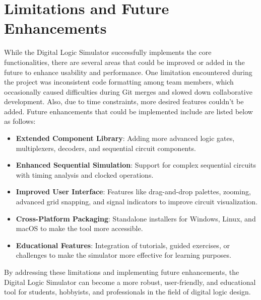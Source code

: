 \section{Limitations and Future Enhancements}
While the Digital Logic Simulator successfully implements the core functionalities, there are several areas that could be improved or added in the future to enhance usability and performance. One limitation encountered during the project was inconsistent code formatting among team members, which occasionally caused difficulties during Git merges and slowed down collaborative development. Also, due to time constraints, more desired features couldn't be added. Future enhancements that could be implemented include are listed below as follows:
\begin{itemize}
    \item \textbf{Extended Component Library}: Adding more advanced logic gates, multiplexers, decoders, and sequential circuit components.
    \item \textbf{Enhanced Sequential Simulation}: Support for complex sequential circuits with timing analysis and clocked operations.
    \item \textbf{Improved User Interface}: Features like drag-and-drop palettes, zooming, advanced grid snapping, and signal indicators to improve circuit visualization.
    \item \textbf{Cross-Platform Packaging}: Standalone installers for Windows, Linux, and macOS to make the tool more accessible.
    \item \textbf{Educational Features}: Integration of tutorials, guided exercises, or challenges to make the simulator more effective for learning purposes.
\end{itemize}

\vspace{0.5cm}
By addressing these limitations and implementing future enhancements, the Digital Logic Simulator can become a more robust, user-friendly, and educational tool for students, hobbyists, and professionals in the field of digital logic design.
\clearpage
